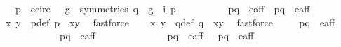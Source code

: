 \begin{isabellebody}
\ \ \ {\isachardoublequoteopen}{\isacharparenleft}p\ {\isasymin}\ e{\isacharunderscore}circ\ {\isasymand}\ {\isacharparenleft}{\isasymexists}\ g\ {\isasymin}\ symmetries{\isachardot}\ q\ {\isacharequal}\ {\isacharparenleft}g\ {\isasymcirc}\ i{\isacharparenright}\ p{\isacharparenright}{\isacharparenright}\ {\isasymor}\isanewline
\ \ \ \ \ \ \ \ \ {\isacharparenleft}p{\isacharcomma}q{\isacharparenright}\ {\isasymin}\ e{\isacharunderscore}aff{\isacharunderscore}{}\ {\isasymor}\ {\isacharparenleft}p{\isacharcomma}q{\isacharparenright}\ {\isasymin}\ e{\isacharunderscore}aff{\isacharunderscore}{}{\isachardoublequoteclose}\ \isanewline
%
\isadelimproof
%
\endisadelimproof
%
\isatagproof
{}\isamarkupfalse%
\ {\isacharminus}\isanewline
\ \ \isamarkupfalse%
\ x{}\ y{}\ \ p{\isacharunderscore}def{\isacharcolon}\ {\isachardoublequoteopen}p\ {\isacharequal}\ {\isacharparenleft}x{}{\isacharcomma}y{}{\isacharparenright}{\isachardoublequoteclose}\ \isamarkupfalse%
\ fastforce\isanewline
\ \ \isamarkupfalse%
\ x{}\ y{}\ \ q{\isacharunderscore}def{\isacharcolon}\ {\isachardoublequoteopen}q\ {\isacharequal}\ {\isacharparenleft}x{}{\isacharcomma}y{}{\isacharparenright}{\isachardoublequoteclose}\ \isamarkupfalse%
\ fastforce\isanewline
\isanewline
\ \ \isamarkupfalse%
\ {\isacharparenleft}{}{\isacharparenright}\ {\isachardoublequoteopen}{\isacharparenleft}p{\isacharcomma}q{\isacharparenright}\ {\isasymin}\ e{\isacharunderscore}aff{\isacharunderscore}{}{\isachardoublequoteclose}\ {\isacharbar}\isanewline
\ \ \ \ \ \ \ \ \ \ \ {\isacharparenleft}{}{\isacharparenright}\ {\isachardoublequoteopen}{\isacharparenleft}p{\isacharcomma}q{\isacharparenright}\ {\isasymin}\ e{\isacharunderscore}aff{\isacharunderscore}{}{\isachardoublequoteclose}\ {\isacharbar}\isanewline
\ \ \ \ \ \ \ \ \ \ \ {\isacharparenleft}{}{\isacharparenright}\ {\isachardoublequoteopen}{\isasymnot}\ {\isacharparenleft}{\isacharparenleft}p{\isacharcomma}q{\isacharparenright}\ {\isasymin}\ e{\isacharunderscore}aff{\isacharunderscore}{}{\isacharparenright}\ {\isasymand}\ {\isasymnot}\ {\isacharparenleft}{\isacharparenleft}p{\isacharcomma}q{\isacharparenright}\ {\isasymin}\ e{\isacharunderscore}aff{\isacharunderscore}{}{\isacharparenright}{\isachardoublequoteclose}\ \isamarkupfalse%

\end{isabellebody}

